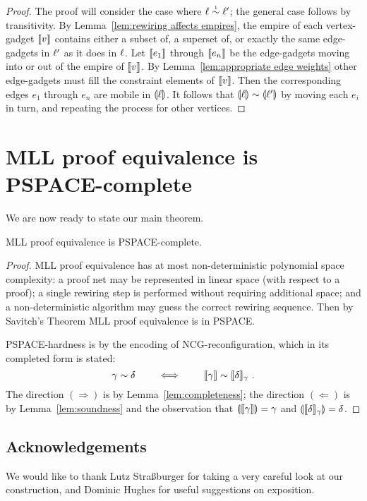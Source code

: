 \documentclass{lmcs}
\let\capsabbrev=\uppercase
\begin{document}
\begin{proof}
The proof will consider the case where $\links\perm*\links'$; the general case follows by transitivity.
%
By Lemma~\ref{lem:rewiring affects empires}, the empire of each vertex-gadget $\llbracket v\rrbracket$ contains either a subset of, a superset of, or exactly the same edge-gadgets in $\ell'$ as it does in $\ell$.
%
Let $\llbracket e_1\rrbracket$ through $\llbracket e_n\rrbracket$ be the edge-gadgets moving into or out of the empire of $\llbracket v\rrbracket$.
%
By Lemma~\ref{lem:appropriate edge weights} other edge-gadgets must fill the constraint elements of $\llbracket v\rrbracket$.
%
Then the corresponding edges $e_1$ through $e_n$ are mobile in $\llparenthesis\ell\rrparenthesis$.
%
It follows that $\coitn\links\perm\coitn{\links'}$ by moving each $e_i$ in turn, and repeating the process for other vertices.
%
\end{proof}





\section{\capsabbrev{mll} proof equivalence is \capsabbrev{pspace}-complete}


%
We are now ready to state our main theorem.


\begin{theorem}
\capsabbrev{mll} proof equivalence is \capsabbrev{pspace}-complete.
\end{theorem}

\begin{proof}
\capsabbrev{mll} proof equivalence has at most non-deterministic polynomial space complexity: a proof net may be represented in linear space (with respect to a proof); a single rewiring step is performed without requiring additional space; and a non-deterministic algorithm may guess the correct rewiring sequence.
%
Then by Savitch's Theorem \cite{Savitch-1970} \capsabbrev{mll} proof equivalence is in \capsabbrev{pspace}.


\capsabbrev{pspace}-hardness is by the encoding of \capsabbrev{ncg}-reconfiguration, which in its completed form is stated:
\[
	\gamma\perm\delta \qquad\iff\qquad \itn\gamma\perm\itn\delta_\gamma~.
\]
%
The direction $(\Rightarrow)$ is by Lemma~\ref{lem:completeness}; the direction $(\Leftarrow)$ is by Lemma~\ref{lem:soundness} and the observation that $\llparenthesis\llbracket\gamma\rrbracket\rrparenthesis=\gamma$ and $\llparenthesis\llbracket\delta\rrbracket_\gamma\rrparenthesis=\delta$.
%
\end{proof}



\subsection*{Acknowledgements}
We would like to thank Lutz Stra{\ss}burger for taking a very careful look at our construction, and Dominic Hughes for useful suggestions on exposition.



\end{document}
